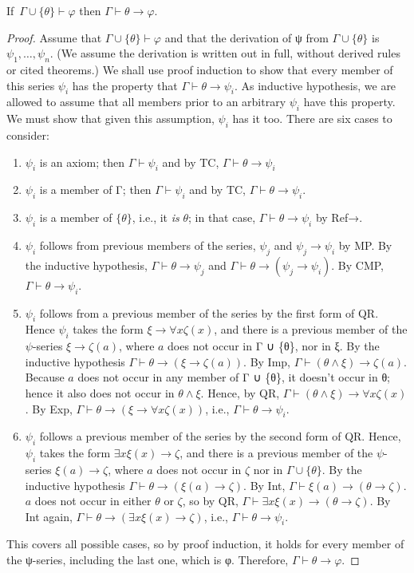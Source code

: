 \documentclass[12pt]{report}
\theoremstyle{nonumberplain}
\newtheorem{proof}{Proof}
\begin{document}
\begin{mt}[DT]
If \,$Γ ∪ \{θ\} ⊢ φ$ then $Γ ⊢ θ → φ$.
\end{mt}
\begin{proof}
Assume that $Γ ∪ \{θ\} ⊢ φ$ and that the derivation of ψ from $Γ ∪ \{θ\}$ is $ψ_1, \dotsc, ψ_n$. (We assume the derivation is written out in full, without derived rules or cited theorems.) We shall use proof induction to show that every member of this series $ψ_i$ has the property that $Γ ⊢ θ → ψ_i$. As inductive hypothesis, we are allowed to assume that all members prior to an arbitrary $ψ_i$ have this property. We must show that given this assumption, $ψ_i$ has it too. There are six cases to consider:
\begin{enumerate}

\item $ψ_i$ is an axiom; then $Γ ⊢ ψ_i$ and by TC, $Γ ⊢ θ → ψ_i$

\item $ψ_i$ is a member of Γ; then $Γ ⊢ ψ_i$ and by TC, $Γ ⊢ θ → ψ_i$.

\item $ψ_i$ is a member of $\{θ\}$, i.e., it \emph{is} $θ$; in that case, $Γ ⊢ θ → ψ_i$ by Ref→.

\item $ψ_i$ follows from previous members of the series, $ψ_j$ and $ψ_j → ψ_i$ by MP. By the inductive hypothesis, $Γ ⊢ θ → ψ_j$ and $Γ ⊢ θ → (ψ_j → ψ_i)$. By CMP, $Γ ⊢ θ → ψ_i$.

\item $ψ_i$ follows from a previous member of the series by the first form of QR. Hence $ψ_i$ takes the form $ξ → ∀xζ(x)$, and there is a previous member of the $ψ$-series $ξ → ζ(a)$, where $a$ does not occur in Γ ∪ \{θ\}, nor in ξ. By the inductive hypothesis $Γ ⊢ θ → (ξ → ζ(a))$. By Imp, $Γ ⊢ (θ ∧ ξ) → ζ(a)$. Because $a$ does not occur in any member of Γ ∪ \{θ\}, it doesn't occur in θ; hence it also does not occur in $θ ∧ ξ$. Hence, by QR, $Γ ⊢ (θ ∧ ξ) → ∀xζ(x)$. By Exp, $Γ ⊢ θ → (ξ → ∀xζ(x))$, i.e., $Γ ⊢ θ → ψ_i$.

\item $ψ_i$ follows a previous member of the series by the second form of QR. Hence, $ψ_i$ takes the form $∃xξ(x) → ζ$, and there is a previous member of the $ψ$-series $ξ(a) → ζ$, where $a$ does not occur in $ζ$ nor in $Γ ∪ \{θ\}$. By the inductive hypothesis $Γ ⊢ θ → (ξ(a) → ζ)$. By Int, $Γ ⊢ ξ(a) → (θ → ζ)$. $a$ does not occur in either $θ$ or $ζ$, so by QR, $Γ ⊢ ∃xξ(x) → (θ → ζ)$. By Int again, $Γ ⊢ θ → (∃xξ(x) → ζ)$, i.e., $Γ ⊢ θ → ψ_i$.
\end{enumerate}

\noindent This covers all possible cases, so by proof induction, it holds for every member of the ψ-series, including the last one, which is φ. Therefore, $Γ ⊢ θ → φ$.
\end{proof}
\end{document}
